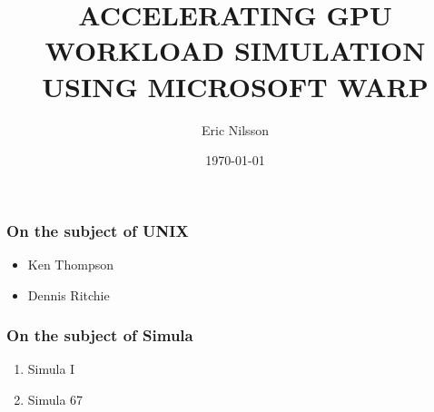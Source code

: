 \documentclass{beamer}
\title{ACCELERATING GPU WORKLOAD SIMULATION USING MICROSOFT WARP}
\author{Eric Nilsson}
\institute{Blekinge Institute of Technology}
\date{\today}
\begin{document}
{%
  \begin{frame}
    \titlepage
  \end{frame}
}

\begin{frame}
\frametitle{On the subject of UNIX}

\begin{itemize}
\item Ken Thompson
\item Dennis Ritchie
\end{itemize}

\end{frame}

\begin{frame}
\frametitle{On the subject of Simula}

\begin{enumerate}
\item Simula I
\item Simula 67
\end{enumerate}

\end{frame}
\end{document}
